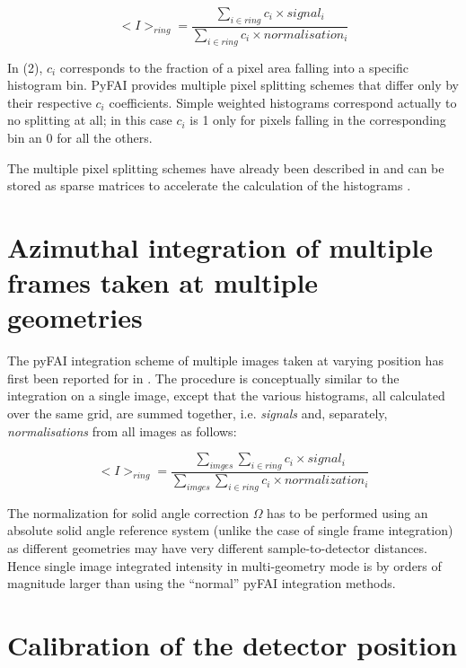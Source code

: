 \documentclass[preprint]{iucr}              %
\begin{document}
\begin{equation}
<I>_{ring} = \frac{\sum\limits_{i \in ring} c_i \times signal_i}
                  {\sum\limits_{i \in ring} c_i \times normalisation_i} 
\end{equation}

In (2), $c_i$ corresponds to the fraction of a pixel area 
falling into a specific histogram bin. 
PyFAI provides multiple pixel splitting schemes that differ only by their
respective $c_i$ coefficients. 
Simple weighted histograms correspond actually to no splitting at all; in this
case $c_i$ is 1 only for pixels falling in the corresponding bin an 0 for all
the others.
  
The multiple pixel splitting schemes have already been described in
 \cite{fv5028} and can be stored as sparse matrices to accelerate the
 calculation of the histograms  \cite{kieffer_ashiotis-proc-euroscipy-2014}.

\section{Azimuthal integration of multiple frames taken at multiple geometries}

The pyFAI integration scheme of multiple images taken at varying position has
first been reported for  in  \cite{PyFAI_PDJ}. 
The procedure is conceptually similar to the integration on a single image,
except that the various histograms, all calculated over the same
grid, are summed together, i.e. \textit{signals} and, separately, 
\textit{normalisations} from all images as follows: 

\begin{equation}
<I>_{ring} = \frac{\sum\limits_{imges} \sum\limits_{i \in ring} c_i \times
signal_i} {\sum\limits_{imges} \sum\limits_{i \in ring} c_i \times
normalization_i} 
\end{equation}

The normalization for solid angle correction $\Omega$ has to be performed
using an absolute solid angle reference system (unlike the case of single
frame integration) as different geometries may have very different
sample-to-detector distances.
Hence single image integrated intensity in multi-geometry mode is by orders of
magnitude larger than using the ``normal'' pyFAI integration methods.

\section{Calibration of the detector position}
\end{document}
